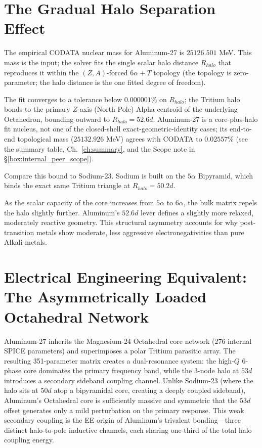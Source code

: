 \section{The Gradual Halo Separation Effect}
The empirical CODATA nuclear mass for Aluminum-27 is $25126.501$ MeV. This mass is the input; the solver fits the single scalar halo distance $R_{halo}$ that reproduces it within the $(Z,A)$-forced $6\alpha + T$ topology (the topology is zero-parameter; the halo distance is the one fitted degree of freedom).

The fit converges to a tolerance below $0.000001\%$ on $R_{halo}$; the Tritium halo bonds to the primary $Z$-axis (North Pole) Alpha centroid of the underlying Octahedron, bounding outward to $R_{halo} = 52.6d$. Aluminum-27 is a core-plus-halo fit nucleus, not one of the closed-shell exact-geometric-identity cases; its end-to-end topological mass ($25132.926$ MeV) agrees with CODATA to $0.02557\%$ (see the summary table, Ch.~\ref{ch:summary}, and the Scope note in \S\ref{box:internal_peer_scope}).

Compare this bound to Sodium-23. Sodium is built on the $5\alpha$ Bipyramid, which binds the exact same Tritium triangle at $R_{halo} = 50.2d$. 

As the scalar capacity of the core increases from $5\alpha$ to $6\alpha$, the bulk matrix repels the halo slightly further. Aluminum's $52.6d$ lever defines a slightly more relaxed, moderately reactive geometry. This structural asymmetry accounts for why post-transition metals show moderate, less aggressive electronegativities than pure Alkali metals.

\section{Electrical Engineering Equivalent: The Asymmetrically Loaded Octahedral Network}
Aluminum-27 inherits the Magnesium-24 Octahedral core network (276 internal SPICE parameters) and superimposes a polar Tritium parasitic array. The resulting 351-parameter matrix creates a dual-resonance system: the high-$Q$ 6-phase core dominates the primary frequency band, while the 3-node halo at $53d$ introduces a secondary sideband coupling channel. Unlike Sodium-23 (where the halo sits at $50d$ atop a bipyramidal core, creating a deeply coupled sideband), Aluminum's Octahedral core is sufficiently massive and symmetric that the $53d$ offset generates only a mild perturbation on the primary response. This weak secondary coupling is the EE origin of Aluminum's trivalent bonding---three distinct halo-to-pole inductive channels, each sharing one-third of the total halo coupling energy.

